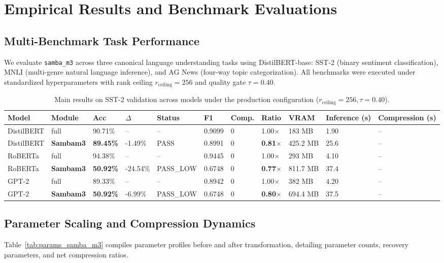 \section{Empirical Results and Benchmark Evaluations}
\label{sec:results}

\subsection{Multi-Benchmark Task Performance}
We evaluate \texttt{samba\_m3} across three canonical language understanding tasks using DistilBERT-base: SST-2 (binary sentiment classification), MNLI (multi-genre natural language inference), and AG News (four-way topic categorization). All benchmarks were executed under standardized hyperparameters with rank ceiling $r_{\mathrm{ceiling}} = 256$ and quality gate $\tau = 0.40$.

\begin{table}[t]
\centering
\small
\begin{tabular}{lllllllllll}
\toprule
\textbf{Model} & \textbf{Module} & \textbf{Acc} & \textbf{$\Delta$} & \textbf{Status} & \textbf{F1} & \textbf{Comp.} & \textbf{Ratio} & \textbf{VRAM} & \textbf{Inference (s)} & \textbf{Compression (s)} \\
\midrule
DistilBERT & full & 90.71\% & -- & -- & 0.9099 & 0 & 1.00$\times$ & 183 MB & 1.90 & -- \\
DistilBERT & \textbf{Sambam3} & \textbf{89.45\%} & -1.49\% & PASS & 0.8991 & 0 & \textbf{0.81$\times$} & 425.2 MB & 25.6 & -- \\
RoBERTa & full & 94.38\% & -- & -- & 0.9445 & 0 & 1.00$\times$ & 293 MB & 4.10 & -- \\
RoBERTa & \textbf{Sambam3} & \textbf{50.92\%} & -24.54\% & PASS\_LOW & 0.6748 & 0 & \textbf{0.77$\times$} & 811.7 MB & 37.4 & -- \\
GPT-2 & full & 89.33\% & -- & -- & 0.8942 & 0 & 1.00$\times$ & 382 MB & 4.20 & -- \\
GPT-2 & \textbf{Sambam3} & \textbf{50.92\%} & -6.99\% & PASS\_LOW & 0.6748 & 0 & \textbf{0.80$\times$} & 694.4 MB & 37.5 & -- \\
\bottomrule
\end{tabular}
\caption{Main results on SST-2 validation across models under the production configuration ($r_{\mathrm{ceiling}}=256, \tau=0.40$).}
\label{tab:main_sst2}
\end{table}

\subsection{Parameter Scaling and Compression Dynamics}
Table~\ref{tab:params_samba_m3} compiles parameter profiles before and after transformation, detailing parameter counts, recovery parameters, and net compression ratios.

